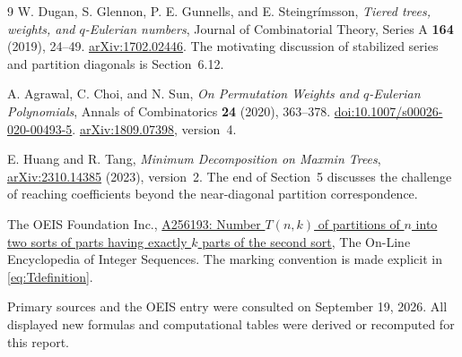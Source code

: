 \documentclass[11pt,letterpaper]{article}
\numberwithin{equation}{section}
\theoremstyle{definition}
\theoremstyle{remark}
\begin{document}
\begin{thebibliography}{9}
W. Dugan, S. Glennon, P. E. Gunnells, and E. Steingr\'imsson,
\emph{Tiered trees, weights, and $q$-Eulerian numbers},
Journal of Combinatorial Theory, Series A \textbf{164} (2019), 24--49.
\href{https://arxiv.org/abs/1702.02446}{arXiv:1702.02446}.
The motivating discussion of stabilized series and partition diagonals
is Section~6.12.

A. Agrawal, C. Choi, and N. Sun,
\emph{On Permutation Weights and $q$-Eulerian Polynomials},
Annals of Combinatorics \textbf{24} (2020), 363--378.
\href{https://doi.org/10.1007/s00026-020-00493-5}{doi:10.1007/s00026-020-00493-5}.
\href{https://arxiv.org/abs/1809.07398}{arXiv:1809.07398}, version~4.

E. Huang and R. Tang,
\emph{Minimum Decomposition on Maxmin Trees},
\href{https://arxiv.org/abs/2310.14385}{arXiv:2310.14385} (2023), version~2.
The end of Section~5 discusses the challenge of reaching coefficients
beyond the near-diagonal partition correspondence.

The OEIS Foundation Inc.,
\href{https://oeis.org/A256193}{A256193: Number $T(n,k)$ of partitions of $n$
into two sorts of parts having exactly $k$ parts of the second sort},
The On-Line Encyclopedia of Integer Sequences.
The marking convention is made explicit in \eqref{eq:Tdefinition}.
\end{thebibliography}
\noindent\small\color{Muted}Primary sources and the OEIS entry were consulted on
September 19, 2026. All displayed new formulas and computational tables
were derived or recomputed for this report.
\end{document}
